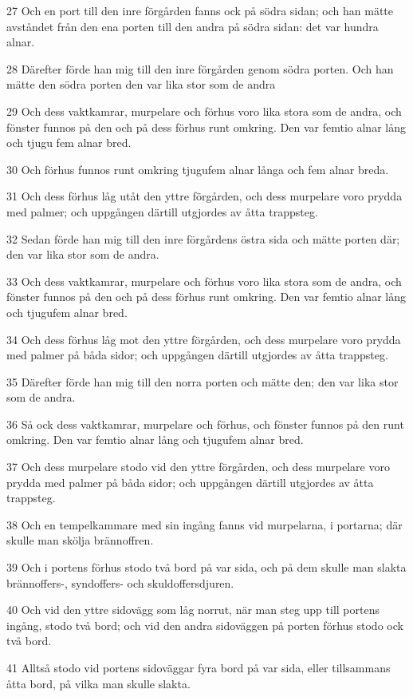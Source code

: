 \par 27 Och en port till den inre förgården fanns ock på södra sidan; och han mätte avståndet från den ena porten till den andra på södra sidan: det var hundra alnar.
\par 28 Därefter förde han mig till den inre förgården genom södra porten. Och han mätte den södra porten den var lika stor som de andra
\par 29 Och dess vaktkamrar, murpelare och förhus voro lika stora som de andra, och fönster funnos på den och på dess förhus runt omkring. Den var femtio alnar lång och tjugu fem alnar bred.
\par 30 Och förhus funnos runt omkring tjugufem alnar långa och fem alnar breda.
\par 31 Och dess förhus låg utåt den yttre förgården, och dess murpelare voro prydda med palmer; och uppgången därtill utgjordes av åtta trappsteg.
\par 32 Sedan förde han mig till den inre förgårdens östra sida och mätte porten där; den var lika stor som de andra.
\par 33 Och dess vaktkamrar, murpelare och förhus voro lika stora som de andra, och fönster funnos på den och på dess förhus runt omkring. Den var femtio alnar lång och tjugufem alnar bred.
\par 34 Och dess förhus låg mot den yttre förgården, och dess murpelare voro prydda med palmer på båda sidor; och uppgången därtill utgjordes av åtta trappsteg.
\par 35 Därefter förde han mig till den norra porten och mätte den; den var lika stor som de andra.
\par 36 Så ock dess vaktkamrar, murpelare och förhus, och fönster funnos på den runt omkring. Den var femtio alnar lång och tjugufem alnar bred.
\par 37 Och dess murpelare stodo vid den yttre förgården, och dess murpelare voro prydda med palmer på båda sidor; och uppgången därtill utgjordes av åtta trappsteg.
\par 38 Och en tempelkammare med sin ingång fanns vid murpelarna, i portarna; där skulle man skölja brännoffren.
\par 39 Och i portens förhus stodo två bord på var sida, och på dem skulle man slakta brännoffers-, syndoffers- och skuldoffersdjuren.
\par 40 Och vid den yttre sidovägg som låg norrut, när man steg upp till portens ingång, stodo två bord; och vid den andra sidoväggen på porten förhus stodo ock två bord.
\par 41 Alltså stodo vid portens sidoväggar fyra bord på var sida, eller tillsammans åtta bord, på vilka man skulle slakta.
